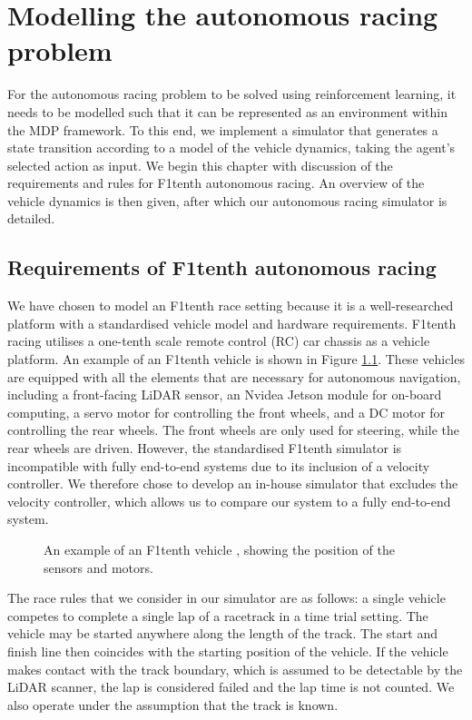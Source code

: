 \chapter{Modelling the autonomous racing problem}
\label{chp:modelling}

For the autonomous racing problem to be solved using reinforcement learning, it needs to be modelled such that it can be represented as an environment within the MDP framework.
To this end, we implement a simulator that generates a state transition according to a model of the vehicle dynamics, taking the agent's selected action as input.
We begin this chapter with discussion of the requirements and rules for F1tenth autonomous racing.
An overview of the vehicle dynamics is then given, after which our autonomous racing simulator is detailed. 


\section{Requirements of F1tenth autonomous racing}\label{sec:f1tenth_requirements}


We have chosen to model an F1tenth race setting because it is a well-researched platform with a standardised vehicle model and hardware requirements.
F1tenth racing utilises a one-tenth scale remote control (RC) car chassis as a vehicle platform.
An example of an F1tenth vehicle is shown in Figure \ref{fig:sim_vehicle}.
These vehicles are equipped with all the elements that are necessary for autonomous navigation, including a front-facing LiDAR sensor, an Nvidea Jetson module for on-board computing, a servo motor for controlling the front wheels, and a DC motor for controlling the rear wheels.
The front wheels are only used for steering, while the rear wheels are driven.
However, the standardised F1tenth simulator is incompatible with fully end-to-end systems due to its inclusion of a velocity controller.
We therefore chose to develop an in-house simulator that excludes the velocity controller, which allows us to compare our system to a fully end-to-end system.


\begin{figure}[htb!]
    \centering
    
    \caption[The simulated F1tenth vehicle]{An example of an F1tenth vehicle \cite{f1tenth}, showing the position of the sensors and motors.}
    \label{fig:sim_vehicle}
\end{figure}

The race rules that we consider in our simulator are as follows: a single vehicle competes to complete a single lap of a racetrack in a time trial setting.
The vehicle may be started anywhere along the length of the track.
The start and finish line then coincides with the starting position of the vehicle.
If the vehicle makes contact with the track boundary, which is assumed to be detectable by the LiDAR scanner, the lap is considered failed and the lap time is not counted.
We also operate under the assumption that the track is known.


